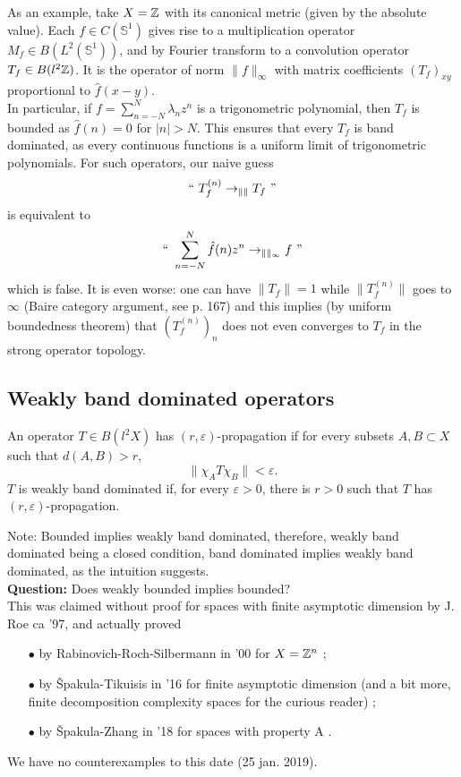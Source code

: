As an example, take $X= \mathbb Z$ with its canonical metric (given by the absolute value). Each $f\in C(\mathbb S^1)$ gives rise to a multiplication operator $M_f\in B(L^2(\mathbb S^1 ))$, and by Fourier transform to a convolution operator $T_f\in B(l^2\mathbb Z)$. It is the operator of norm $\| f\|_\infty$ with matrix coefficients $(T_f)_{xy}$ proportional to $\hat f(x-y)$.\\
In particular, if $f= \sum_{n=-N}^N \lambda_n z^n$ is a trigonometric polynomial, then $T_f$ is bounded as $\hat f(n) =0$ for $|n| >N$. This ensures that every $T_f$ is band dominated, as every continuous functions is a uniform limit of trigonometric polynomials. For such operators, our naive guess 
\[ `` \ T^{(n)}_f \rightarrow_{\| \|} T_f \text{ ''}\]
is equivalent to 
\[``\ \sum_{n=-N}^N \hat f(n)z^n \rightarrow_{\|\|_\infty} f \text{ ''}\]
which is false. It is even worse: one can have $\| T_f \| = 1$ while $\|  T_f^{(n)} \| $ goes to $\infty$ (Baire category argument, see \cite{stein2003princeton} p. 167) and this implies (by uniform boundedness theorem) that $(T_f^{(n)})_n$ does not even converges to $T_f$ in the strong operator topology.

\subsection{Weakly band dominated operators}

\begin{definition}
An operator $T\in B(l^2 X)$ has $(r,\varepsilon)$-propagation if for every subsets $A,B\subset X$ such that $d(A,B)>r$, \[\| \chi_A T\chi_B\| <\varepsilon .\]
$T$ is weakly band dominated if, for every $\varepsilon >0$, there is $r>0$ such that $T$ has $(r,\varepsilon)$-propagation.
\end{definition}

Note: Bounded implies weakly band dominated, therefore, weakly band dominated being a closed condition, band dominated implies weakly band dominated, as the intuition suggests. \\

\textbf{Question:} Does weakly bounded implies bounded?\\

This was claimed without proof for spaces with finite asymptotic dimension by J. Roe ca '97, and actually proved
\begin{itemize}
\item[$\bullet$] by Rabinovich-Roch-Silbermann in '00 for $X=\mathbb Z^n$ \cite{rabinovich2001band};
\item[$\bullet$] by \v{S}pakula-Tikuisis in '16 for finite asymptotic dimension (and a bit more, finite decomposition complexity spaces for the curious reader) \cite{spakula2017relative};
\item[$\bullet$] by \v{S}pakula-Zhang in '18 for spaces with property A \cite{spakula2018quasi}.
\end{itemize}
We have no counterexamples to this date (25 jan. 2019).

